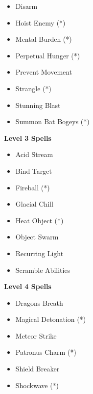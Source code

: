 \begin{multicols}{4}
{\begin{itemize}[itemsep=0em]
\item Disarm

\item Hoist Enemy (*) 

\item Mental Burden (*) 

\item Perpetual Hunger (*) 

\item Prevent Movement

\item Strangle (*) 

\item Stunning Blast

\item Summon Bat Bogeys (*) 


\end{itemize}
\textbf{Level 3 Spells}
\begin{itemize}[itemsep=0em]
\renewcommand\labelitemi{-}
\item Acid Stream

\item Bind Target

\item Fireball (*) 

\item Glacial Chill

\item Heat Object (*) 

\item Object Swarm

\item Recurring Light

\item Scramble Abilities


\end{itemize}
\textbf{Level 4 Spells}
\begin{itemize}[itemsep=0em]
\renewcommand\labelitemi{-}
\item Dragon{\apos}s Breath

\item Magical Detonation (*) 

\item Meteor Strike

\item Patronus Charm (*) 

\item Shield Breaker

\item Shockwave (*) 



\end{itemize}}
\end{multicols}
